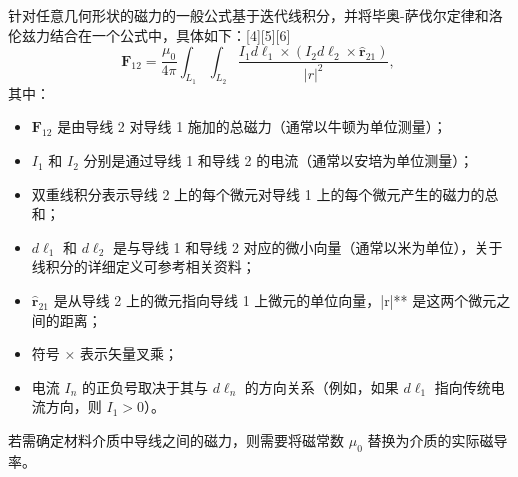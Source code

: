 针对任意几何形状的磁力的一般公式基于迭代线积分，并将毕奥-萨伐尔定律和洛伦兹力结合在一个公式中，具体如下：[4][5][6]
\[
\mathbf{F}_{12} = \frac{\mu_0}{4\pi} \int_{L_1} \int_{L_2} \frac{I_1 d\boldsymbol{\ell}_1 \times \left( I_2 d\boldsymbol{\ell}_2 \times \hat{\mathbf{r}}_{21} \right)}{|r|^2},~
\]
其中：
\begin{itemize}
\item \( \mathbf{F}_{12} \) 是由导线 2 对导线 1 施加的总磁力（通常以牛顿为单位测量）；
\item \( I_1 \) 和 \( I_2 \) 分别是通过导线 1 和导线 2 的电流（通常以安培为单位测量）；
\item 双重线积分表示导线 2 上的每个微元对导线 1 上的每个微元产生的磁力的总和；
\item \( d\boldsymbol{\ell}_1 \) 和 \( d\boldsymbol{\ell}_2 \) 是与导线 1 和导线 2 对应的微小向量（通常以米为单位），关于线积分的详细定义可参考相关资料；
\item \( \hat{\mathbf{r}}_{21} \) 是从导线 2 上的微元指向导线 1 上微元的单位向量，|r|** 是这两个微元之间的距离；
\item 符号 × 表示矢量叉乘；
\item 电流 \( I_n \) 的正负号取决于其与 \( d\boldsymbol{\ell}_n \) 的方向关系（例如，如果 \( d\boldsymbol{\ell}_1 \) 指向传统电流方向，则 \( I_1 > 0 \)）。
\end{itemize}

若需确定材料介质中导线之间的磁力，则需要将磁常数 \( \mu_0 \) 替换为介质的实际磁导率。